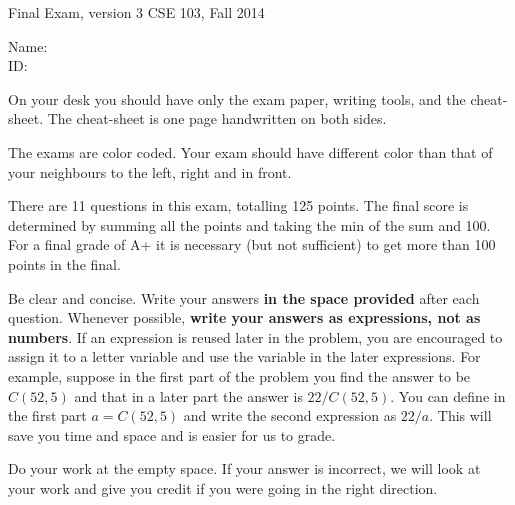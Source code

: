 \documentclass[10pt,dvips]{amsart}
\begin{document}
\voffset=-0.8in
\newpage
{\textbf \Large Final Exam, version 3} \hfill CSE 103, Fall 2014
\\

\vspace{.25in}

Name: \underline{\hspace{3in}}
\\

ID: \underline{\hspace{3.2in}}
\\

\vspace{0.5in}

On your desk you should have only the exam paper, writing tools, and
the cheat-sheet. The cheat-sheet is one page handwritten on both sides.

The exams are color coded. Your exam should have different color 
than that of your neighbours to the left, right and in front.

There are 11 questions in this exam, totalling 125 points.  The final
score is determined by summing all the points and taking the min of
the sum and 100. For a final grade of A+ it is necessary (but not
sufficient) to get more than 100 points in the final. 

Be clear and concise. Write your answers {\bf in the space provided}
after each question. Whenever possible, {\bf write your answers
as expressions, not as numbers}. If an expression is reused
later in the problem, you are encouraged to assign it to a letter
variable and use the variable in the later expressions. For example,
suppose in the first part of the problem you find the answer to be
$C(52,5)$ and that in a later part the answer is $22/C(52,5)$. You can
define in the first part $a=C(52,5)$ and write the second expression
as $22/a$. This will save you time and space and is easier for us to
grade.

Do your work at the empty space. If your answer is incorrect, we will
look at your work and give you credit if you were going in the right direction.

\vspace{0.2in}
\end{document}
